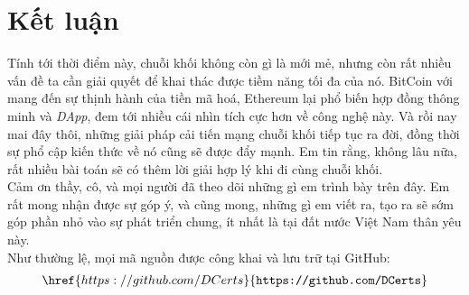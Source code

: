 \section{Kết luận}
Tính tới thời điểm này, chuỗi khối không còn gì là mới mẻ, nhưng còn rất nhiều vấn đề ta cần giải quyết để khai thác được tiềm năng tối đa của nó. BitCoin với mang đến sự thịnh hành của tiền mã hoá, Ethereum lại phổ biến hợp đồng thông minh và \textit{DApp}, đem tới nhiều cái nhìn tích cực hơn về công nghệ này. Và rồi nay mai đây thôi, những giải pháp cải tiến mạng chuỗi khối tiếp tục ra đời, đồng thời sự phổ cập kiến thức về nó cũng sẽ được đẩy mạnh. Em tin rằng, không lâu nữa, rất nhiều bài toán sẽ có thêm lời giải hợp lý khi đi cùng chuỗi khối.\\

Cảm ơn thầy, cô, và mọi người đã theo dõi những gì em trình bày trên đây. Em rất mong nhận được sự góp ý, và cũng mong, những gì em viết ra, tạo ra sẽ sớm góp phần nhỏ vào sự phát triển chung, ít nhất là tại đất nước Việt Nam thân yêu này.\\

Như thường lệ, mọi mã nguồn được công khai và lưu trữ tại GitHub:
\begin{align*}
    \href{https://github.com/DCerts}{\texttt{https://github.com/DCerts}}
\end{align*}